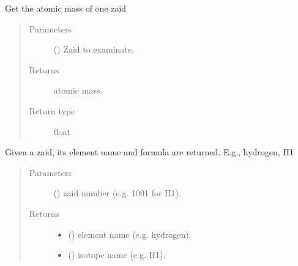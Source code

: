 \documentclass[letterpaper,10pt,english]{sphinxmanual}
\begin{document}
\begin{fulllineitems}
\begin{fulllineitems}
\label{\detokenize{api/initobjects:libmanager.LibManager.get_zaid_mass}}
\sphinxAtStartPar
Get the atomic mass of one zaid
\begin{quote}\begin{description}
\item[{Parameters}] \leavevmode
\sphinxAtStartPar
{} ({\hyperref[\detokenize{api/inputgeneration:matreader.Zaid}]{}}) \textendash{} Zaid to examinate.

\item[{Returns}] \leavevmode
\sphinxAtStartPar
{} \textendash{} atomic mass.

\item[{Return type}] \leavevmode
\sphinxAtStartPar
float

\end{description}\end{quote}

\end{fulllineitems}


\begin{fulllineitems}
\label{\detokenize{api/initobjects:libmanager.LibManager.get_zaidname}}
\sphinxAtStartPar
Given a zaid, its element name and formula are returned. E.g.,
hydrogen, H1
\begin{quote}\begin{description}
\item[{Parameters}] \leavevmode
\sphinxAtStartPar
{} () \textendash{} zaid number (e.g. 1001 for H1).

\item[{Returns}] \leavevmode
\sphinxAtStartPar
\begin{itemize}
\item {} 
\sphinxAtStartPar
{} () \textendash{} element name (e.g. hydrogen).

\item {} 
\sphinxAtStartPar
{} () \textendash{} isotope name (e.g. H1).


\end{itemize}
\end{description}
\end{quote}
\end{fulllineitems}
\end{fulllineitems}
\end{document}

